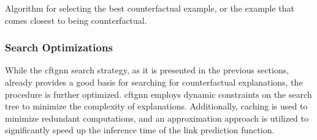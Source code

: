{
\setlength{\algomargin}{1.25em}
\small
\begin{algorithm}[ht]
\caption{Algorithm for selecting the best counterfactual example, or the example that comes closest to being counterfactual.}
\label{a_MCTS_ResultSelection}
\end{algorithm}
}

\FloatBarrier
\subsubsection{Search Optimizations}
\label{s_Methodology_CoDy_Optimizations}

While the \gls{cftgnn} search strategy, as it is presented in the previous sections, already provides a good basis for searching for counterfactual explanations, the procedure is further optimized. \gls{cftgnn} employs dynamic constraints on the search tree to minimize the complexity of explanations. Additionally, caching is used to minimize redundant computations, and an approximation approach is utilized to significantly speed up the inference time of the link prediction function.

